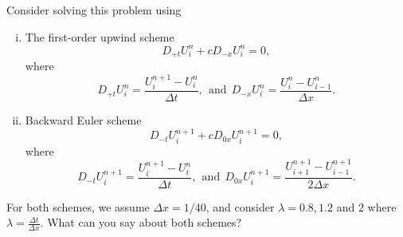 \documentclass[11pt]{article}
\begin{document}
\begin{enumerate}
Consider solving this problem using 
\begin{enumerate}[(i)]
\item The first-order upwind scheme 
$$
D_{+t}U_i^n+cD_{-x}{U_i^n}=0,
$$
where 
$$
D_{+t}U_i^n = \frac{U^{n+1}_i-U^{n}_i}{\Delta t},~~\text{and}~~
D_{-x}{U_i^n}= \frac{U^{n}_i-U^{n}_{i-1}}{\Delta x}.
$$
\item   Backward Euler scheme
$$
D_{-t}U_i^{n+1}+cD_{0x}{U_i^{n+1}}=0,
$$
where 
$$
D_{-t}U_i^{n+1} = \frac{U^{n+1}_i-U^{n}_i}{\Delta t},~~\text{and}~~
D_{0x}{U_i^{n+1}}= \frac{U^{n+1}_{i+1}-U^{n+1}_{i-1}}{2\Delta x}.
$$


\end{enumerate}
For both schemes,  we assume $\Delta x=1/40$, and consider $\lambda=0.8, 1.2$ and $2$ where  $\lambda=\frac{\Delta t}{\Delta x}$. What can you say about both schemes?


\end{enumerate}
\end{document}
